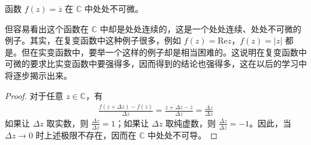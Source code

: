 \documentclass[../../main.tex]{subfiles}
\begin{document}
\begin{example}
函数 \( f(z) = \overline{z} \) 在 \( \mathbb{C} \) 中处处不可微。
\end{example}
\begin{note}
但容易看出这个函数在 \( \mathbb{C} \) 中却是处处连续的，这是一个处处连续、处处不可微的例子。其实，在复变函数中这种例子很多，例如 \( f(z) = \text{Re}z \)，\( f(z) = |z| \) 都是。但在实变函数中，要举一个这样的例子却是相当困难的。这说明在复变函数中可微的要求比实变函数中要强得多，因而得到的结论也强得多，这在以后的学习中将逐步揭示出来。
\end{note}
\begin{proof}
对于任意 \( z \in \mathbb{C} \)，有
\begin{align*}
\frac{f(z + \Delta z) - f(z)}{\Delta z} = \frac{\overline{z + \Delta z} - \overline{z}}{\Delta z} = \frac{\overline{\Delta z}}{\Delta z}
\end{align*}
如果让 \( \Delta z \) 取实数，则 \( \frac{\overline{\Delta z}}{\Delta z} = 1 \)；如果让 \( \Delta z \) 取纯虚数，则 \( \frac{\overline{\Delta z}}{\Delta z} = -1 \)。因此，当 \( \Delta z \to 0 \) 时上述极限不存在，因而在 \( \mathbb{C} \) 中处处不可导。

\end{proof}
\end{document}
